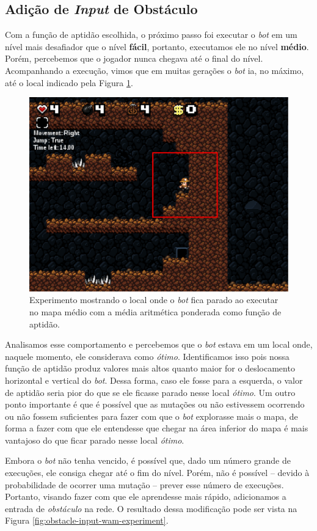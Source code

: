 \subsection{Adição de \textit{Input} de Obstáculo}

Com a função de aptidão escolhida, o próximo passo foi executar o \textit{bot}
em um nível mais desafiador que o nível \textbf{fácil}, portanto, executamos
ele no nível \textbf{médio}. Porém, percebemos que o jogador nunca chegava até
o final do nível. Acompanhando a execução, vimos que em muitas gerações o
\textit{bot} ia, no máximo, até o local indicado pela Figura
\ref{fig:experiment-medium-stuck}.

\begin{figure}[htb!]
\centering
\includegraphics[width=.5\textwidth]{fig/experiment-medium-stuck.pdf}
\caption{Experimento mostrando o local onde o \textit{bot} fica parado ao
    executar no mapa médio com a média aritmética ponderada como função de
    aptidão.}
\label{fig:experiment-medium-stuck}
\end{figure}

Analisamos esse comportamento e percebemos que o \textit{bot} estava em um
local onde, naquele momento, ele considerava como \textit{ótimo}. Identificamos
isso pois nossa função de aptidão produz valores mais altos quanto maior for o
deslocamento horizontal e vertical do \textit{bot}. Dessa forma, caso ele fosse
para a esquerda, o valor de aptidão seria pior do que se ele ficasse parado
nesse local \textit{ótimo}. Um outro ponto importante é que é possível que as
mutações ou não estivessem ocorrendo ou não fossem suficientes para fazer com
que o \textit{bot} explorasse mais o mapa, de forma a fazer com que ele
entendesse que chegar na área inferior do mapa é mais vantajoso do que ficar
parado nesse local \textit{ótimo}.


Embora o \textit{bot} não tenha vencido, é possível que, dado um número grande
de execuções, ele consiga chegar até o fim do nível. Porém, não é possível --
devido à probabilidade de ocorrer uma mutação -- prever esse número de
execuções. Portanto, visando fazer com que ele aprendesse mais rápido,
adicionamos a entrada de \textit{obstáculo} na rede. O resultado dessa
modificação pode ser vista na Figura \ref{fig:obstacle-input-wam-experiment}.

